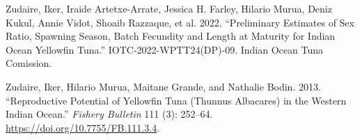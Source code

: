 \documentclass[
]{scrartcl}
\newlength{\cslhangindent}
\newenvironment{CSLReferences}[2] %
 {\begin{list}{}{%
  \setlength{\itemindent}{0pt}
  \setlength{\leftmargin}{0pt}
  \setlength{\parsep}{0pt}
  \ifodd #1
   \setlength{\leftmargin}{\cslhangindent}
   \setlength{\itemindent}{-1\cslhangindent}
  \fi
  \setlength{\itemsep}{#2\baselineskip}}}
 {\end{list}}
\begin{document}
\begin{CSLReferences}{1}{0}
Zudaire, Iker, Iraide Artetxe-Arrate, Jessica H. Farley, Hilario Murua,
Deniz Kukul, Annie Vidot, Shoaib Razzaque, et al. 2022. {``Preliminary
Estimates of Sex Ratio, Spawning Season, Batch Fecundity and Length at
Maturity for {Indian Ocean} Yellowfin Tuna.''} IOTC-2022-WPTT24(DP)-09.
Indian Ocean Tuna Comission.

Zudaire, Iker, Hilario Murua, Maitane Grande, and Nathalie Bodin. 2013.
{``Reproductive Potential of {Yellowfin Tuna} ({Thunnus} Albacares) in
the Western {Indian Ocean}.''} \emph{Fishery Bulletin} 111 (3): 252--64.
\url{https://doi.org/10.7755/FB.111.3.4}.

\end{CSLReferences}
\end{document}
